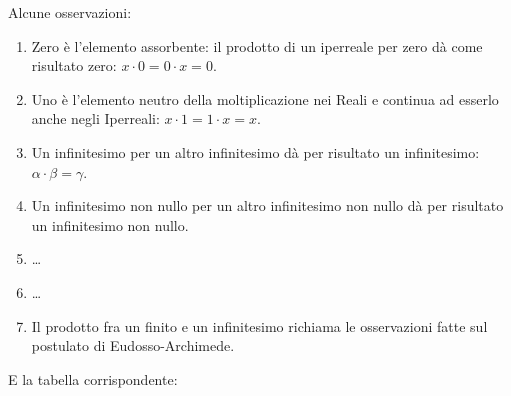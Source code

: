 \begin{multicols}{2}
Alcune osservazioni:
\begin{enumerate} [noitemsep]
 \item Zero è l'elemento assorbente: il prodotto di un iperreale per zero
dà come risultato zero: $x \cdot 0=0 \cdot x=0$.
 \item Uno è l'elemento neutro della moltiplicazione nei Reali e continua 
ad 
esserlo anche negli Iperreali: $x \cdot 1=1 \cdot x=x$.
 \item Un infinitesimo per un altro infinitesimo dà per risultato un 
infinitesimo: $\alpha \cdot \beta=\gamma$.
 \item Un infinitesimo non nullo per un altro infinitesimo non nullo dà 
per risultato un infinitesimo non nullo.
 \item \dots
 \item \dots
 \item Il prodotto fra un finito e un infinitesimo richiama le osservazioni 
fatte sul postulato di Eudosso-Archimede.
 \end{enumerate}
E la tabella corrispondente:
\begin{center}
\renewcommand{\arraystretch}{.0}
\end{center}
\end{multicols}

